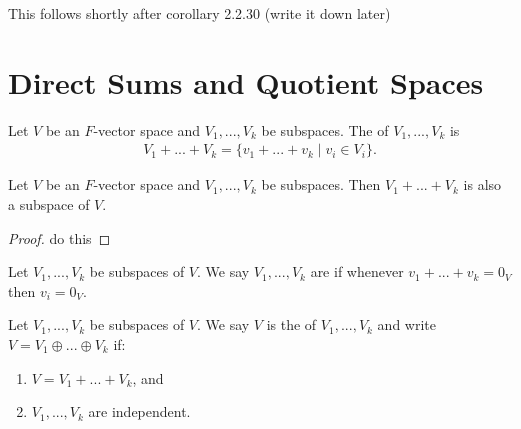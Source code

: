     \begin{example}
        {\color{red} This follows shortly after corollary 2.2.30 (write it down later)}
    \end{example}

\section{Direct Sums and Quotient Spaces}
    \begin{definition}
        Let $V$ be an $F$-vector space and $V_1,...,V_k$ be subspaces. The  of $V_1,...,V_k$ is 
            \begin{equation*}
            \begin{split}
                V_1 + ... + V_k = \{v_1 + ... + v_k \mid v_i \in V_i \}.
            \end{split}
            \end{equation*}
    \end{definition}

    \begin{proposition}
        Let $V$ be an $F$-vector space and $V_1,...,V_k$ be subspaces. Then $V_1 + ... + V_k$ is also a subspace of $V$.
    \end{proposition}
        \begin{proof}
            \color{red} do this
        \end{proof}
    
    \begin{definition}
        Let $V_1,...,V_k$ be subspaces of $V$. We say $V_1,...,V_k$ are  if whenever $v_1 + ... + v_k = 0_V$ then $v_i = 0_V$.
    \end{definition}
    
    \begin{definition}
        Let $V_1,...,V_k$ be subspaces of $V$. We say $V$ is the  of $V_1,...,V_k$ and write $V = V_1 \oplus ... \oplus V_k$ if:
            \begin{enumerate}[label = (\arabic*)]
                \item $V = V_1 + ... + V_k$, and
                \item $V_1,...,V_k$ are independent.
            \end{enumerate}
    \end{definition}

